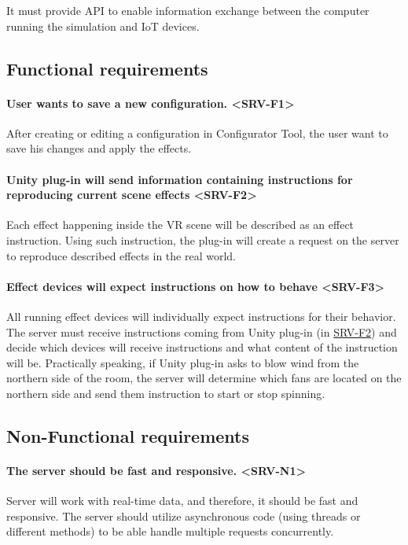 It must provide API to enable
information exchange between the computer running the simulation and IoT devices.


\subsection{Functional requirements}

\paragraph*{User wants to save a new configuration. <SRV-F1>}
\label{srv-f1}
After creating or editing a configuration in Configurator Tool, the user
want to save his changes and apply the effects.


\paragraph*{Unity plug-in will send information containing instructions for reproducing current scene effects <SRV-F2>}
\label{srv-f2}
Each effect happening inside the VR scene will be described as an effect
instruction. Using such instruction, the plug-in will create a request on the server to
reproduce described effects in the real world.


\paragraph*{Effect devices will expect instructions on how to behave <SRV-F3>}
\label{srv-f3}
All running effect devices will individually expect instructions for their
behavior. The server must receive instructions coming from Unity plug-in (in \hyperref[srv-f2]{SRV-F2})
and decide which devices will receive instructions and what content of the
instruction will be.
Practically speaking, if Unity plug-in asks to blow wind from the northern side of
the room, the server will determine which fans are located on the northern side
and send them instruction to start or stop spinning.

\pagebreak

\subsection{Non-Functional requirements}

\paragraph*{The server should be fast and responsive. <SRV-N1>}
\label{srv-n1}
Server will work with real-time data, and therefore, it should be fast and
responsive. The server should utilize asynchronous code (using threads or 
different methods) to be able handle multiple requests concurrently.

